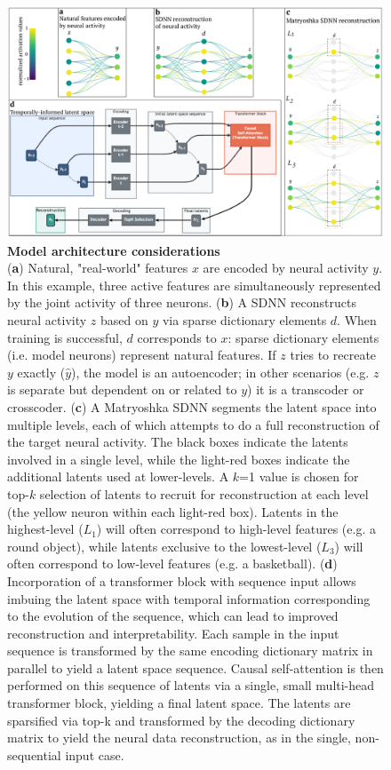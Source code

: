 \begin{figure}[tbph]
    \includegraphics[width=\linewidth]{figures/sdnn_arch.pdf}
    \caption{
        \textbf{Model architecture considerations} \\
        \small
        (\textbf{a}) Natural, "real-world" features $x$ are encoded by neural activity $y$. In this example, three active features are simultaneously represented by the joint activity of three neurons. (\textbf{b}) A SDNN reconstructs neural activity $z$ based on $y$ via sparse dictionary elements $d$. When training is successful, $d$ corresponds to $x$: sparse dictionary elements (i.e. model neurons) represent natural features. If $z$ tries to recreate $y$ exactly ($\hat{y}$), the model is an autoencoder; in other scenarios (e.g. $z$ is separate but dependent on or related to $y$) it is a transcoder or crosscoder. (\textbf{c}) A Matryoshka SDNN segments the latent space into multiple levels, each of which attempts to do a full reconstruction of the target neural activity. The black boxes indicate the latents involved in a single level, while the light-red boxes indicate the additional latents used at lower-levels. A $k$=1 value is chosen for top-$k$ selection of latents to recruit for reconstruction at each level (the yellow neuron within each light-red box). Latents in the highest-level ($L_1$) will often correspond to high-level features (e.g. a round object), while latents exclusive to the lowest-level ($L_3$) will often correspond to low-level features (e.g. a basketball). (\textbf{d}) Incorporation of a transformer block with sequence input allows imbuing the latent space with temporal information corresponding to the evolution of the sequence, which can lead to improved reconstruction and interpretability. Each sample in the input sequence is transformed by the same encoding dictionary matrix in parallel to yield a latent space sequence. Causal self-attention is then performed on this sequence of latents via a single, small multi-head transformer block, yielding a final latent space. The latents are sparsified via top-k and transformed by the decoding dictionary matrix to yield the neural data reconstruction, as in the single, non-sequential input case. 
    }
    \label{figure:sdnn_arch}
\end{figure}

